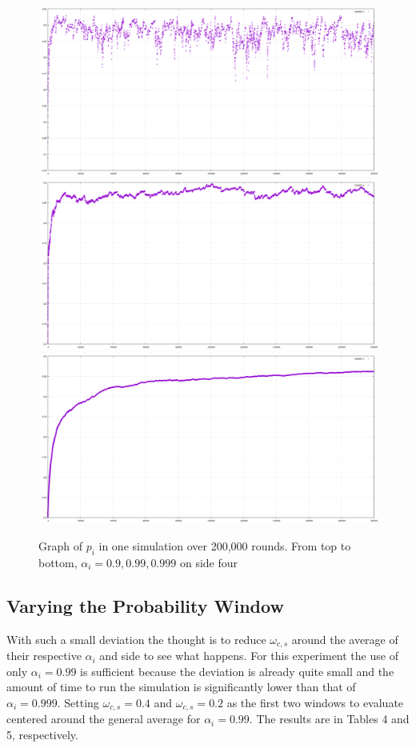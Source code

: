 \documentclass{article}
\begin{document}
\begin{figure}[htp]
\centering
\includegraphics[width=.8\textwidth]{images/ai9side4x200000}\hfill
\includegraphics[width=.8\textwidth]{images/ai99side4x200000}\hfill
\includegraphics[width=.8\textwidth]{images/ai999side4x200000}
\caption{Graph of $p_i$ in one simulation over 200,000 rounds. From top to bottom, $\alpha_i = 0.9, 0.99, 0.999$ on side four}
\label{fig:figure3}
\end{figure}

\subsection{Varying the Probability Window}

With such a small deviation the thought is to reduce $\omega_{c,s}$ around the average of their respective $\alpha_i$ and side to see what happens.  For this experiment the use of only $\alpha_i = 0.99$ is sufficient because the deviation is already quite small and the amount of time to run the simulation is significantly lower than that of $\alpha_i = 0.999$.  Setting $\omega_{c,s} = 0.4$ and $\omega_{c,s} = 0.2$ as the first two windows to evaluate centered around the general average for $\alpha_i =  0.99$.  The results are in Tables 4 and 5, respectively.
\end{document}
